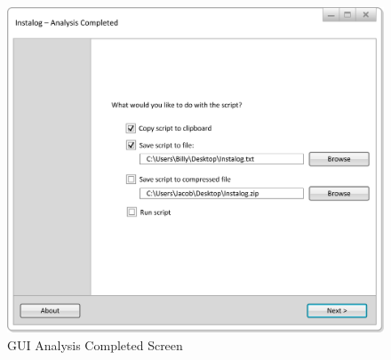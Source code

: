 \begin{figure}[h]
  	\centering
	\includegraphics{figures/gui/Analysis_Completed.png}
  	\caption{GUI Analysis Completed Screen}
  	\label{fig:gui_analysis_completed}
\end{figure}

